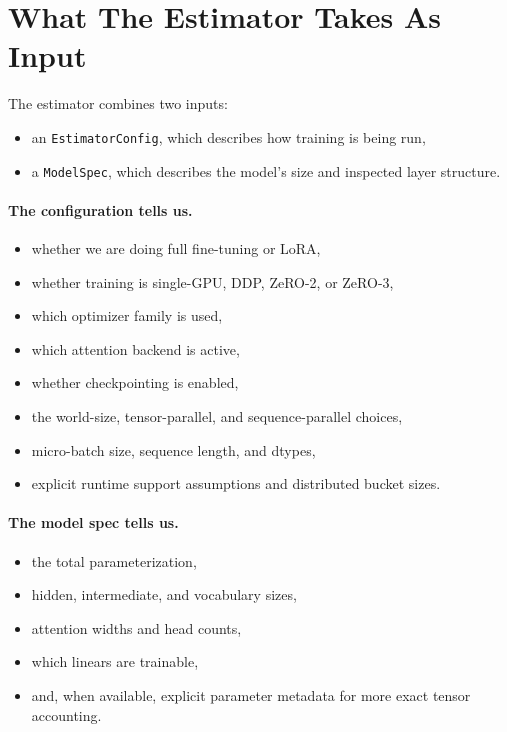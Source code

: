\section{What The Estimator Takes As Input}
The estimator combines two inputs:
\begin{itemize}[leftmargin=1.5em]
\item an \texttt{EstimatorConfig}, which describes how training is being run,
\item a \texttt{ModelSpec}, which describes the model's size and inspected
layer structure.
\end{itemize}

\paragraph{The configuration tells us.}
\begin{itemize}[leftmargin=1.5em]
\item whether we are doing full fine-tuning or LoRA,
\item whether training is single-GPU, DDP, ZeRO-2, or ZeRO-3,
\item which optimizer family is used,
\item which attention backend is active,
\item whether checkpointing is enabled,
\item the world-size, tensor-parallel, and sequence-parallel choices,
\item micro-batch size, sequence length, and dtypes,
\item explicit runtime support assumptions and distributed bucket sizes.
\end{itemize}

\paragraph{The model spec tells us.}
\begin{itemize}[leftmargin=1.5em]
\item the total parameterization,
\item hidden, intermediate, and vocabulary sizes,
\item attention widths and head counts,
\item which linears are trainable,
\item and, when available, explicit parameter metadata for more exact tensor
accounting.
\end{itemize}

